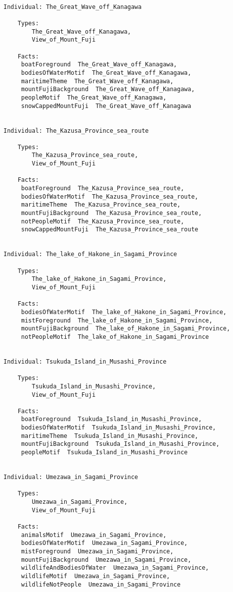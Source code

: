 \documentclass[titlepage,a4paper,12pt,oneside]{book}
\begin{document}
\begin{appendices}
\begin{lstlisting}
    
Individual: The_Great_Wave_off_Kanagawa

    Types: 
        The_Great_Wave_off_Kanagawa,
        View_of_Mount_Fuji
    
    Facts:  
     boatForeground  The_Great_Wave_off_Kanagawa,
     bodiesOfWaterMotif  The_Great_Wave_off_Kanagawa,
     maritimeTheme  The_Great_Wave_off_Kanagawa,
     mountFujiBackground  The_Great_Wave_off_Kanagawa,
     peopleMotif  The_Great_Wave_off_Kanagawa,
     snowCappedMountFuji  The_Great_Wave_off_Kanagawa
    
    
Individual: The_Kazusa_Province_sea_route

    Types: 
        The_Kazusa_Province_sea_route,
        View_of_Mount_Fuji
    
    Facts:  
     boatForeground  The_Kazusa_Province_sea_route,
     bodiesOfWaterMotif  The_Kazusa_Province_sea_route,
     maritimeTheme  The_Kazusa_Province_sea_route,
     mountFujiBackground  The_Kazusa_Province_sea_route,
     notPeopleMotif  The_Kazusa_Province_sea_route,
     snowCappedMountFuji  The_Kazusa_Province_sea_route
    
    
Individual: The_lake_of_Hakone_in_Sagami_Province

    Types: 
        The_lake_of_Hakone_in_Sagami_Province,
        View_of_Mount_Fuji
    
    Facts:  
     bodiesOfWaterMotif  The_lake_of_Hakone_in_Sagami_Province,
     mistForeground  The_lake_of_Hakone_in_Sagami_Province,
     mountFujiBackground  The_lake_of_Hakone_in_Sagami_Province,
     notPeopleMotif  The_lake_of_Hakone_in_Sagami_Province
    
    
Individual: Tsukuda_Island_in_Musashi_Province

    Types: 
        Tsukuda_Island_in_Musashi_Province,
        View_of_Mount_Fuji
    
    Facts:  
     boatForeground  Tsukuda_Island_in_Musashi_Province,
     bodiesOfWaterMotif  Tsukuda_Island_in_Musashi_Province,
     maritimeTheme  Tsukuda_Island_in_Musashi_Province,
     mountFujiBackground  Tsukuda_Island_in_Musashi_Province,
     peopleMotif  Tsukuda_Island_in_Musashi_Province
    
    
Individual: Umezawa_in_Sagami_Province

    Types: 
        Umezawa_in_Sagami_Province,
        View_of_Mount_Fuji
    
    Facts:  
     animalsMotif  Umezawa_in_Sagami_Province,
     bodiesOfWaterMotif  Umezawa_in_Sagami_Province,
     mistForeground  Umezawa_in_Sagami_Province,
     mountFujiBackground  Umezawa_in_Sagami_Province,
     wildlifeAndBodiesOfWater  Umezawa_in_Sagami_Province,
     wildlifeMotif  Umezawa_in_Sagami_Province,
     wildlifeNotPeople  Umezawa_in_Sagami_Province
    

\end{lstlisting}
\end{appendices}
\end{document}
